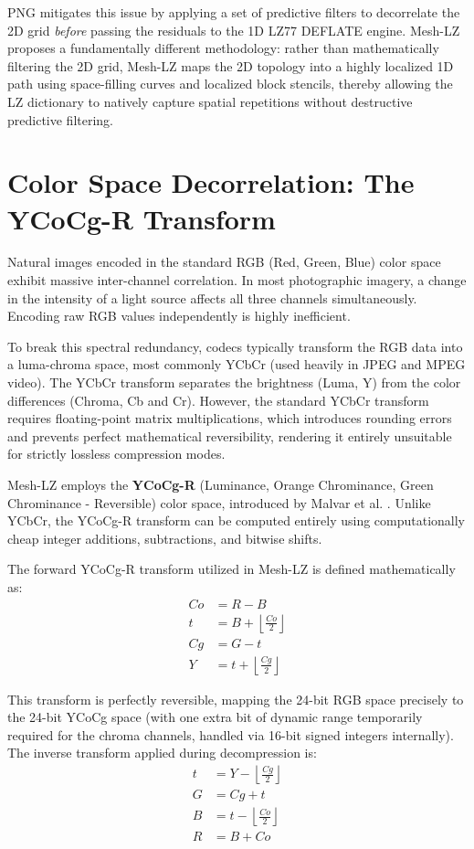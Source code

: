PNG mitigates this issue by applying a set of predictive filters to decorrelate the 2D grid \textit{before} passing the residuals to the 1D LZ77 DEFLATE engine. Mesh-LZ proposes a fundamentally different methodology: rather than mathematically filtering the 2D grid, Mesh-LZ maps the 2D topology into a highly localized 1D path using space-filling curves and localized block stencils, thereby allowing the LZ dictionary to natively capture spatial repetitions without destructive predictive filtering.

\section{Color Space Decorrelation: The YCoCg-R Transform}

Natural images encoded in the standard RGB (Red, Green, Blue) color space exhibit massive inter-channel correlation. In most photographic imagery, a change in the intensity of a light source affects all three channels simultaneously. Encoding raw RGB values independently is highly inefficient.

To break this spectral redundancy, codecs typically transform the RGB data into a luma-chroma space, most commonly YCbCr (used heavily in JPEG and MPEG video). The YCbCr transform separates the brightness (Luma, Y) from the color differences (Chroma, Cb and Cr). However, the standard YCbCr transform requires floating-point matrix multiplications, which introduces rounding errors and prevents perfect mathematical reversibility, rendering it entirely unsuitable for strictly lossless compression modes.

Mesh-LZ employs the \textbf{YCoCg-R} (Luminance, Orange Chrominance, Green Chrominance - Reversible) color space, introduced by Malvar et al. \cite{malvar2003lifting}. Unlike YCbCr, the YCoCg-R transform can be computed entirely using computationally cheap integer additions, subtractions, and bitwise shifts. 

The forward YCoCg-R transform utilized in Mesh-LZ is defined mathematically as:
\begin{align}
    Co &= R - B \\
    t &= B + \left\lfloor \frac{Co}{2} \right\rfloor \\
    Cg &= G - t \\
    Y &= t + \left\lfloor \frac{Cg}{2} \right\rfloor
\end{align}

This transform is perfectly reversible, mapping the 24-bit RGB space precisely to the 24-bit YCoCg space (with one extra bit of dynamic range temporarily required for the chroma channels, handled via 16-bit signed integers internally). The inverse transform applied during decompression is:
\begin{align}
    t &= Y - \left\lfloor \frac{Cg}{2} \right\rfloor \\
    G &= Cg + t \\
    B &= t - \left\lfloor \frac{Co}{2} \right\rfloor \\
    R &= B + Co
\end{align}

